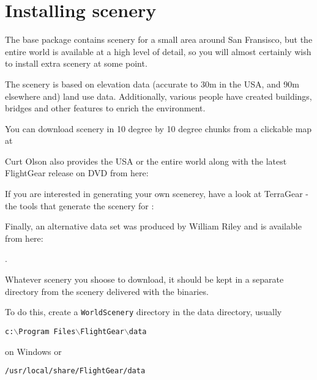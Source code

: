 \section{Installing scenery}

The \FlightGear{} base package contains scenery for a small area around San Fransisco, but the entire world is available at a high level of detail, so you will almost certainly wish to install extra scenery at some point.

The scenery is based on  elevation data (accurate to 30m in the USA, and 90m elsewhere and)  land use data. Additionally, various people have created buildings, bridges and other features to enrich the environment.

You can download scenery in 10 degree by 10 degree chunks from a clickable map at

\medskip
{}
\medskip

Curt Olson also provides the USA or the entire world along with the latest FlightGear release on DVD from here:

\medskip
{}
\medskip

If you are interested in generating your own scenerey, have a look at TerraGear - the tools that generate the scenery for \FlightGear{}:

\medskip
{}
\medskip

Finally, an alternative data set was produced by William Riley and is available from here:

\medskip
{}.
\medskip

\medskip
Whatever scenery you shoose to download, it should be kept in a separate directory from the scenery delivered with the binaries. 

To do this, create a \texttt{WorldScenery} directory in the \FlightGear{} data directory, usually 

\texttt{c:$\backslash$Program Files$\backslash$FlightGear$\backslash$data} 

\noindent on Windows or 

\texttt{/usr/local/share/FlightGear/data} 

